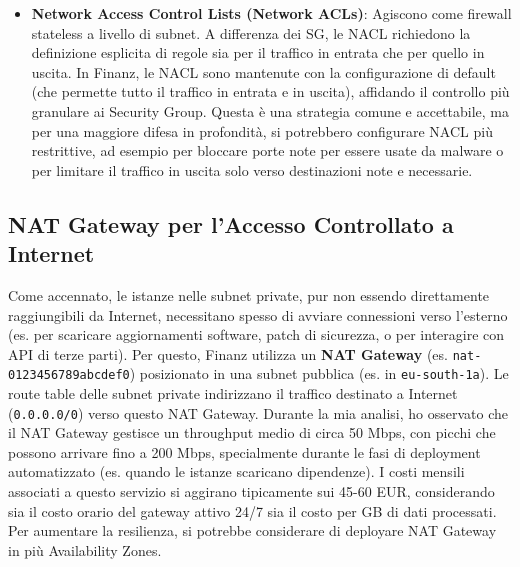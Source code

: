 \begin{itemize}
    \item \textbf{Network Access Control Lists (Network ACLs)}: Agiscono come firewall stateless a livello di subnet. A differenza dei SG, le NACL richiedono la definizione esplicita di regole sia per il traffico in entrata che per quello in uscita. In Finanz, le NACL sono mantenute con la configurazione di default (che permette tutto il traffico in entrata e in uscita), affidando il controllo più granulare ai Security Group. Questa è una strategia comune e accettabile, ma per una maggiore difesa in profondità, si potrebbero configurare NACL più restrittive, ad esempio per bloccare porte note per essere usate da malware o per limitare il traffico in uscita solo verso destinazioni note e necessarie.
\end{itemize}

\subsection{NAT Gateway per l'Accesso Controllato a Internet}
\label{subsec:nat-gateway_cap2}
Come accennato, le istanze nelle subnet private, pur non essendo direttamente raggiungibili da Internet, necessitano spesso di avviare connessioni verso l'esterno (es. per scaricare aggiornamenti software, patch di sicurezza, o per interagire con API di terze parti). Per questo, Finanz utilizza un \textbf{NAT Gateway} (es. \texttt{nat-0123456789abcdef0}) posizionato in una subnet pubblica (es. in \texttt{eu-south-1a}). Le route table delle subnet private indirizzano il traffico destinato a Internet (\texttt{0.0.0.0/0}) verso questo NAT Gateway.
Durante la mia analisi, ho osservato che il NAT Gateway gestisce un throughput medio di circa 50 Mbps, con picchi che possono arrivare fino a 200 Mbps, specialmente durante le fasi di deployment automatizzato (es. quando le istanze scaricano dipendenze). I costi mensili associati a questo servizio si aggirano tipicamente sui 45-60 EUR, considerando sia il costo orario del gateway attivo 24/7 sia il costo per GB di dati processati. Per aumentare la resilienza, si potrebbe considerare di deployare NAT Gateway in più Availability Zones.


